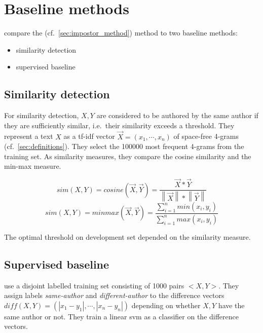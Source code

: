\section{Baseline methods}
\label{sec:impostor_baseline_methods}

\citet{koppel_determining_2014} compare the \imp{} (cf.~\autoref{sec:impostor_method}) method to two baseline methods:
\begin{itemize}
    \item similarity detection
    \item supervised baseline
\end{itemize}


\subsection{Similarity detection}
\label{sec:imp_similarity_detection}

For similarity detection, $X,Y$ are considered to be authored by the same author if they are sufficiently similar, 
i.e.\ their similarity exceeds a threshold.
They represent a text $X$ as a tf-idf vector $\overrightarrow{X}= (x_1, \cdots , x_n)$ 
of space-free 4-grams (cf.~\autoref{sec:definitions}).
They select the 100000 most frequent 4-grams from the training set.
As similarity measures, they compare the cosine similarity and the min-max measure.

$$sim(X,Y)=cosine(\overrightarrow{X},\overrightarrow{Y})=\frac{\overrightarrow{X}*\overrightarrow{Y}}{\left\| \overrightarrow{X} \right\|*\left\| \overrightarrow{Y} \right\|}$$
$$sim(X,Y)=minmax(\overrightarrow{X},\overrightarrow{Y})=\frac{\sum_{i=1}^{n}min(x_i,y_i)}{\sum_{i=1}^{n}max(x_i,y_i)}$$

The optimal threshold on \citet{koppel_determining_2014} development set depended on the similarity measure.


\subsection{Supervised baseline}
\label{sec:imp_supervised_baseline}

\citet{koppel_determining_2014} use a disjoint labelled training set consisting of 1000 pairs $<X,Y>$.
They assign labels \textit{same-author} and \textit{different-author} 
to the difference vectors $diff(X,Y)= (\left| x_1-y_1 \right|, \cdots , \left| x_n-y_n \right|)$ 
depending on whether $X,Y$ have the same author or not.
They train a linear \ac{svm} as a classifier on the difference vectors.
